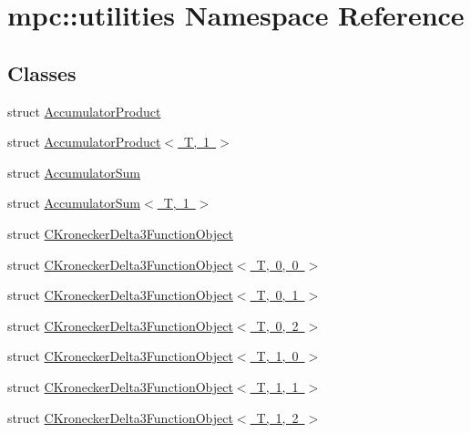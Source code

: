 \hypertarget{namespacempc_1_1utilities}{}\section{mpc\+:\+:utilities Namespace Reference}
\label{namespacempc_1_1utilities}
\subsection*{Classes}
\begin{DoxyCompactItemize}
\item 
struct \mbox{\hyperlink{structmpc_1_1utilities_1_1_accumulator_product}{Accumulator\+Product}}
\item 
struct \mbox{\hyperlink{structmpc_1_1utilities_1_1_accumulator_product_3_01_t_00_011_01_4}{Accumulator\+Product$<$ T, 1 $>$}}
\item 
struct \mbox{\hyperlink{structmpc_1_1utilities_1_1_accumulator_sum}{Accumulator\+Sum}}
\item 
struct \mbox{\hyperlink{structmpc_1_1utilities_1_1_accumulator_sum_3_01_t_00_011_01_4}{Accumulator\+Sum$<$ T, 1 $>$}}
\item 
struct \mbox{\hyperlink{structmpc_1_1utilities_1_1_c_kronecker_delta3_function_object}{C\+Kronecker\+Delta3\+Function\+Object}}
\item 
struct \mbox{\hyperlink{structmpc_1_1utilities_1_1_c_kronecker_delta3_function_object_3_01_t_00_010_00_010_01_4}{C\+Kronecker\+Delta3\+Function\+Object$<$ T, 0, 0 $>$}}
\item 
struct \mbox{\hyperlink{structmpc_1_1utilities_1_1_c_kronecker_delta3_function_object_3_01_t_00_010_00_011_01_4}{C\+Kronecker\+Delta3\+Function\+Object$<$ T, 0, 1 $>$}}
\item 
struct \mbox{\hyperlink{structmpc_1_1utilities_1_1_c_kronecker_delta3_function_object_3_01_t_00_010_00_012_01_4}{C\+Kronecker\+Delta3\+Function\+Object$<$ T, 0, 2 $>$}}
\item 
struct \mbox{\hyperlink{structmpc_1_1utilities_1_1_c_kronecker_delta3_function_object_3_01_t_00_011_00_010_01_4}{C\+Kronecker\+Delta3\+Function\+Object$<$ T, 1, 0 $>$}}
\item 
struct \mbox{\hyperlink{structmpc_1_1utilities_1_1_c_kronecker_delta3_function_object_3_01_t_00_011_00_011_01_4}{C\+Kronecker\+Delta3\+Function\+Object$<$ T, 1, 1 $>$}}
\item 
struct \mbox{\hyperlink{structmpc_1_1utilities_1_1_c_kronecker_delta3_function_object_3_01_t_00_011_00_012_01_4}{C\+Kronecker\+Delta3\+Function\+Object$<$ T, 1, 2 $>$}}

\end{DoxyCompactItemize}

